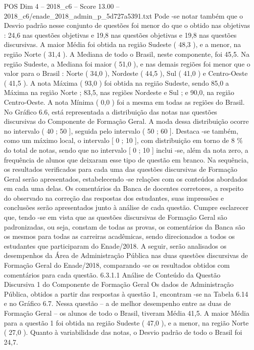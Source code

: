 \begin{textsample}{POS Dim 4 – 2018\_c6 – Score 13.00 – 2018\_c6/enade\_2018\_admin\_p\_5d727a5391.txt}
Pode -se notar também que o Desvio padrão nesse conjunto de questões foi menor do que o obtido nas objetivas : 24,6 nas questões objetivas e 19,8 nas questões objetivas e 19,8 nas questões discursivas.
A maior Média foi obtida na região Sudeste ( 48,3 ), e a menor, na região Norte ( 31,4 ).
A Mediana de todo o Brasil, neste componente, foi 45,5.
Na região Sudeste, a Mediana foi maior ( 51,0 ), e nas demais regiões foi menor que o valor para o Brasil : Norte ( 34,0 ), Nordeste ( 44,5 ), Sul ( 41,0 ) e Centro-Oeste ( 41,5 ).
A nota Máxima ( 93,0 ) foi obtida na região Sudeste, sendo 85,0 a Máxima na região Norte ; 83,5, nas regiões Nordeste e Sul ; e 90,0, na região Centro-Oeste.
A nota Mínima ( 0,0 ) foi a mesma em todas as regiões do Brasil.
No Gráfico 6.6, está representada a distribuição das notas nas questões discursivas do Componente de Formação Geral.
A moda dessa distribuição ocorre no intervalo ( 40 ; 50 ], seguida pelo intervalo ( 50 ; 60 ].
Destaca -se também, como um máximo local, o intervalo [ 0 ; 10 ], com distribuição em torno de 8 \% do total de notas, sendo que no intervalo [ 0 ; 10 ] inclui -se, além da nota zero, a frequência de alunos que deixaram esse tipo de questão em branco.
Na sequência, os resultados verificados para cada uma das questões discursivas de Formação Geral serão apresentados, estabelecendo -se relações com os conteúdos abordados em cada uma delas.
Os comentários da Banca de docentes corretores, a respeito do observado na correção das respostas dos estudantes, suas impressões e conclusões serão apresentados junto à análise de cada questão.
Cumpre esclarecer que, tendo -se em vista que as questões discursivas de Formação Geral são padronizadas, ou seja, constam de todas as provas, os comentários da Banca são os mesmos para todas as carreiras acadêmicas, sendo direcionados a todos os estudantes que participaram do Enade/2018.
A seguir, serão analisados os desempenhos da Área de Administração Pública nas duas questões discursivas de Formação Geral do Enade/2018, comparando -se os resultados obtidos com comentários para cada questão. 6.3.1.1 Análise de Conteúdo da Questão Discursiva 1 do Componente de Formação Geral Os dados de Administração Pública, obtidos a partir das respostas à questão 1, encontram -se na Tabela 6.14 e no Gráfico 6.7.
Nessa questão – a de melhor desempenho entre as duas de Formação Geral – os alunos de todo o Brasil, tiveram Média 41,5.
A maior Média para a questão 1 foi obtida na região Sudeste ( 47,0 ), e a menor, na região Norte ( 27,0 ).
Quanto à variabilidade das notas, o Desvio padrão de todo o Brasil foi 24,7.

\end{textsample}
